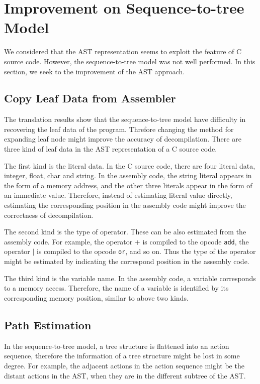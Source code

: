 \documentclass[senior,final,11pt]{iscs-thesis}
\begin{document}
\section{Improvement on Sequence-to-tree Model}
We considered that the AST representation seems to exploit the feature of C source code. 
However, the sequence-to-tree model was not well performed.
In this section, we seek to the improvement of the AST approach.
\subsection{Copy Leaf Data from Assembler}
The translation results show that the sequence-to-tree model have difficulty in recovering the leaf data of the program.
Threfore changing the method for expanding leaf node might improve the accuracy of decompilation.
There are three kind of leaf data in the AST representation of a C source code.

The first kind is the literal data. In the C source code, there are four literal data, integer, float, char and string. 
In the assembly code, the string literal appears in the form of a memory address, and the other three literals appear in the form of an immediate value.
Therefore, instead of estimating literal value directly, estimating the corresponding position in the assembly code might improve the correctness of decompilation.

The second kind is the type of operator. These can be also estimated from the assembly code.
For example, the operator $ + $ is compiled to the opcode \texttt{add}, the operator $ | $ is compiled to the opcode \texttt{or}, and so on. 
Thus the type of the operator might be estimated by indicating the correspond position in the assembly code.

The third kind is the variable name. In the assembly code, a variable corresponds to a memory access. 
Therefore, the name of a variable is identified by its corresponding memory position, similar to above two kinds.

\subsection{Path Estimation} 
In the sequence-to-tree model, a tree structure is flattened into an action sequence, 
therefore the information of a tree structure might be lost in some degree.
For example, the adjacent actions in the action sequence might be the distant actions in the AST, when they are in the different subtree of the AST.
\end{document}
